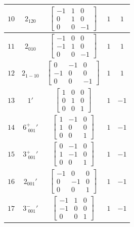 \documentclass[fleqn,8pt]{jsarticle}
\begin{document}
\begin{longtable}{ccccc}
$ 10 $ & $ 2{}_{120} $ & $ \begin{bmatrix} -1 & 1 & 0 \\ 0 & 1 & 0 \\ 0 & 0 & -1 \end{bmatrix} $ & $ 1 $ & $ 1 $ \\ \hline
$ 11 $ & $ 2{}_{010} $ & $ \begin{bmatrix} -1 & 0 & 0 \\ -1 & 1 & 0 \\ 0 & 0 & -1 \end{bmatrix} $ & $ 1 $ & $ 1 $ \\ \hline
$ 12 $ & $ 2{}_{1-10} $ & $ \begin{bmatrix} 0 & -1 & 0 \\ -1 & 0 & 0 \\ 0 & 0 & -1 \end{bmatrix} $ & $ 1 $ & $ 1 $ \\ \hline
$ 13 $ & $ 1{}' $ & $ \begin{bmatrix} 1 & 0 & 0 \\ 0 & 1 & 0 \\ 0 & 0 & 1 \end{bmatrix} $ & $ 1 $ & $ -1 $ \\ \hline
$ 14 $ & $ 6^{+}_{\,\,001}{}' $ & $ \begin{bmatrix} 1 & -1 & 0 \\ 1 & 0 & 0 \\ 0 & 0 & 1 \end{bmatrix} $ & $ 1 $ & $ -1 $ \\ \hline
$ 15 $ & $ 3^{+}_{\,\,001}{}' $ & $ \begin{bmatrix} 0 & -1 & 0 \\ 1 & -1 & 0 \\ 0 & 0 & 1 \end{bmatrix} $ & $ 1 $ & $ -1 $ \\ \hline
$ 16 $ & $ 2{}_{001}{}' $ & $ \begin{bmatrix} -1 & 0 & 0 \\ 0 & -1 & 0 \\ 0 & 0 & 1 \end{bmatrix} $ & $ 1 $ & $ -1 $ \\ \hline
$ 17 $ & $ 3^{-}_{\,\,001}{}' $ & $ \begin{bmatrix} -1 & 1 & 0 \\ -1 & 0 & 0 \\ 0 & 0 & 1 \end{bmatrix} $ & $ 1 $ & $ -1 $ \\ \hline

\end{longtable}
\end{document}
